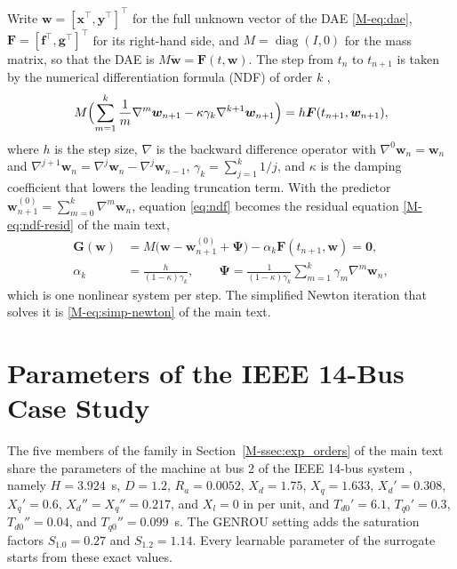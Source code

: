 \documentclass[10pt,journal]{IEEEtran}
\begin{document}
Write $\bm{w}=[\bm{x}^\top,\bm{y}^\top]^\top$ for the full unknown vector of the DAE \eqref{M-eq:dae}, $\bm{F}=[\bm{f}^\top,\bm{g}^\top]^\top$ for its right-hand side, and $M=\operatorname{diag}(I,0)$ for the mass matrix, so that the DAE is $M\dot{\bm{w}}=\bm{F}(t,\bm{w})$.
The step from $t_n$ to $t_{n+1}$ is taken by the numerical differentiation formula (NDF) of order $k$ \cite{klopfensteinNumericalDifferentiationFormulas1971},
\begin{equation}\label{eq:ndf}
M\Bigl(\sum_{m=1}^{k}\frac{1}{m}\nabla^m\bm{w}_{n+1}-\kappa\gamma_k\nabla^{k+1}\bm{w}_{n+1}\Bigr)
=h\bm{F}(t_{n+1},\bm{w}_{n+1}),
\end{equation}
where $h$ is the step size, $\nabla$ is the backward difference operator with $\nabla^0\bm{w}_n=\bm{w}_n$ and $\nabla^{j+1}\bm{w}_n=\nabla^j\bm{w}_n-\nabla^j\bm{w}_{n-1}$, $\gamma_k=\sum_{j=1}^{k}1/j$, and $\kappa$ is the damping coefficient that lowers the leading truncation term.
With the predictor $\bm{w}_{n+1}^{(0)}=\sum_{m=0}^{k}\nabla^m\bm{w}_n$, equation \eqref{eq:ndf} becomes the residual equation \eqref{M-eq:ndf-resid} of the main text,
\begin{equation}\label{eq:ndf-resid}
\begin{aligned}
\bm{G}(\bm{w})&=M\bigl(\bm{w}-\bm{w}_{n+1}^{(0)}+\bm{\Psi}\bigr)-\alpha_k\bm{F}(t_{n+1},\bm{w})=\bm{0},\\
\alpha_k&=\frac{h}{(1-\kappa)\gamma_k},\qquad
\bm{\Psi}=\frac{1}{(1-\kappa)\gamma_k}\sum_{m=1}^{k}\gamma_m\nabla^m\bm{w}_n,
\end{aligned}
\end{equation}
which is one nonlinear system per step.
The simplified Newton iteration that solves it is \eqref{M-eq:simp-newton} of the main text.

\section{Parameters of the IEEE 14-Bus Case Study}\label{sec:params}

The five members of the family in Section~\ref{M-ssec:exp_orders} of the main text share the parameters of the machine at bus 2 of the IEEE 14-bus system \cite{milano2010}, namely $H=3.924$~s, $D=1.2$, $R_a=0.0052$, $X_d=1.75$, $X_q=1.633$, $X_d'=0.308$, $X_q'=0.6$, $X_d''=X_q''=0.217$, and $X_l=0$ in per unit, and $T_{d0}'=6.1$, $T_{q0}'=0.3$, $T_{d0}''=0.04$, and $T_{q0}''=0.099$~s.
The GENROU setting adds the saturation factors $S_{1.0}=0.27$ and $S_{1.2}=1.14$.
Every learnable parameter of the surrogate starts from these exact values.
\end{document}
